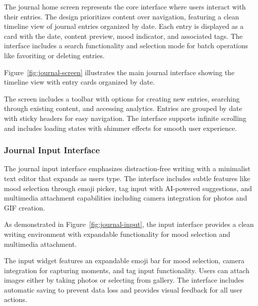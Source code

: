 The journal home screen represents the core interface where users interact with their entries. The design prioritizes content over navigation, featuring a clean timeline view of journal entries organized by date. Each entry is displayed as a card with the date, content preview, mood indicator, and associated tags. The interface includes a search functionality and selection mode for batch operations like favoriting or deleting entries.

Figure~\ref{fig:journal-screen} illustrates the main journal interface showing the timeline view with entry cards organized by date.


The screen includes a toolbar with options for creating new entries, searching through existing content, and accessing analytics. Entries are grouped by date with sticky headers for easy navigation. The interface supports infinite scrolling and includes loading states with shimmer effects for smooth user experience.

\subsubsection{Journal Input Interface}

The journal input interface emphasizes distraction-free writing with a minimalist text editor that expands as users type. The interface includes subtle features like mood selection through emoji picker, tag input with AI-powered suggestions, and multimedia attachment capabilities including camera integration for photos and GIF creation.

As demonstrated in Figure~\ref{fig:journal-input}, the input interface provides a clean writing environment with expandable functionality for mood selection and multimedia attachment.


The input widget features an expandable emoji bar for mood selection, camera integration for capturing moments, and tag input functionality. Users can attach images either by taking photos or selecting from gallery. The interface includes automatic saving to prevent data loss and provides visual feedback for all user actions.

